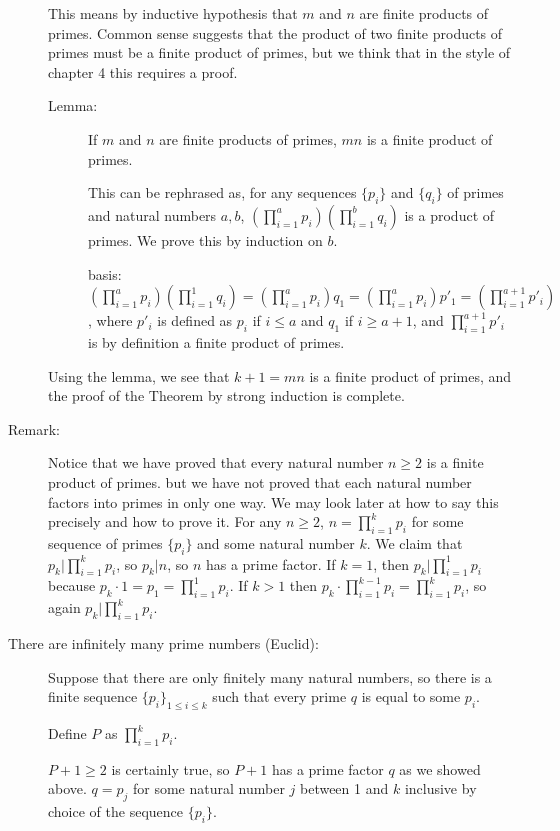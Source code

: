 \documentclass[12pt]{article}
\begin{document}
\begin{description}
This means by inductive hypothesis that $m$ and $n$ are finite products of primes.  Common sense suggests that
the product of two finite products of primes must be a finite product of primes, but we think that in the style of chapter 4 this requires a proof.

\begin{description}

\item[Lemma:]  If $m$ and $n$ are finite products of primes, $mn$ is a finite product of primes.

This can be rephrased as, for any sequences $\{p_i\}$ and $\{q_i\}$ of primes and natural numbers $a,b$,
$(\prod _{i=1}^a p_i)(\prod_{i=1}^b q_i)$ is a product of primes.  We prove this by induction on $b$.

basis:  $(\prod _{i=1}^a p_i)(\prod_{i=1}^1 q_i) = (\prod _{i=1}^a p_i)q_1 = (\prod _{i=1}^a p_i)p'_1= (\prod _{i=1}^{a+1} p'_i)$, where
$p'_i$ is defined as $p_i$ if $i\leq a$ and $q_1$ if $i \geq a+1$, and $\prod _{i=1}^{a+1} p'_i$ is by definition a finite product of primes.

\end{description}

Using the lemma, we see that $k+1 = mn$ is a finite product of primes, and the proof of the Theorem by strong induction is complete.

\item[Remark:]  Notice that we have proved that every natural number $n \geq 2$ is a finite product of primes. but we have not proved that each natural number factors into primes in only one way.  We may look later at how to say this precisely and how to prove it.  For any $n \geq 2$, $n = \prod_{i=1}^k p_i$ for some sequence of primes $\{p_i\}$ and some natural number $k$.   We claim that $p_k | \prod_{i=1}^k p_i$, so $p_k |n$, so $n$ has a prime factor.  If $k=1$, then $p_k | \prod_{i=1}^1 p_i$ because $p_k\cdot 1 = p _1 = \prod_{i=1}^1 p_i$.  If $k>1$ then $p_k \cdot \prod_{i=1}^{k-1}p_i = \prod_{i=1}^k p_i$, so again $p_k | \prod_{i=1}^k p_i$.

\item[There are infinitely many prime numbers (Euclid):]

Suppose that there are only finitely many natural numbers, so there is a finite sequence $\{p_i\}_{1 \leq i \leq k}$ such that every prime $q$ is equal to some $p_i$.

Define $P$ as $\prod_{i=1}^k p_i$.

$P+1 \geq 2$ is certainly true, so $P+1$ has a prime factor $q$ as we showed above.  $q=p_j$ for some natural number $j$ between 1 and $k$ inclusive by choice of the sequence $\{p_i\}$.


\end{description}
\end{document}
